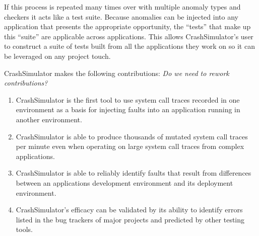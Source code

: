 If this process is repeated many times over with multiple anomaly types and checkers it acts like a test suite.  Because
anomalies can be injected into any application that presents the appropriate opportunity, the ``tests'' that make up
this ``suite'' are applicable across applications.  This allows CrashSimulator's user to construct a suite of tests
built from all the applications they work on so it can be leveraged on any project touch.

CrashSimulator makes the following contributions: \emph{Do we need to rework contributions?}

    \begin{enumerate}
        \item{CrashSimulator is the first tool to use system call traces recorded in one environment as a basis for
            injecting faults into an application running in another environment.}
        \item{CrashSimulator is able to produce thousands of mutated system call traces per minute even when operating
            on large system call traces from complex applications.}
        \item{CrashSimulator is able to reliably identify faults that result from differences between an applications
            development environment and its deployment environment.}
        \item{CrashSimulator's efficacy can be validated by its ability to identify errors listed in the bug trackers of
            major projects and predicted by other testing tools.}
    \end{enumerate}
